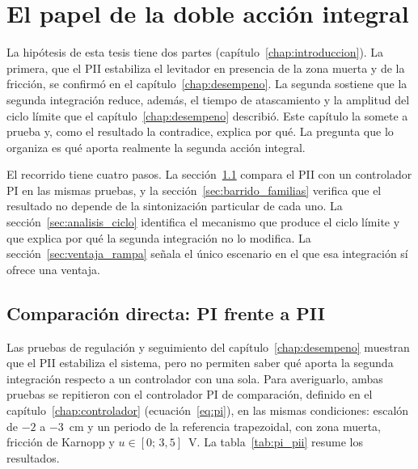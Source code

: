 \chapter{El papel de la doble acción integral}\label{chap:doble_integral}

La hipótesis de esta tesis tiene dos partes (capítulo~\ref{chap:introduccion}). La primera, que el PII estabiliza el levitador en presencia de la zona muerta y de la fricción, se confirmó en el capítulo~\ref{chap:desempeno}. La segunda sostiene que la segunda integración reduce, además, el tiempo de atascamiento y la amplitud del ciclo límite que el capítulo~\ref{chap:desempeno} describió. Este capítulo la somete a prueba y, como el resultado la contradice, explica por qué. La pregunta que lo organiza es qué aporta realmente la segunda acción integral.

El recorrido tiene cuatro pasos. La sección~\ref{sec:pi_pii} compara el PII con un controlador PI en las mismas pruebas, y la sección~\ref{sec:barrido_familias} verifica que el resultado no depende de la sintonización particular de cada uno. La sección~\ref{sec:analisis_ciclo} identifica el mecanismo que produce el ciclo límite y que explica por qué la segunda integración no lo modifica. La sección~\ref{sec:ventaja_rampa} señala el único escenario en el que esa integración sí ofrece una ventaja.

\section{Comparación directa: PI frente a PII}\label{sec:pi_pii}

Las pruebas de regulación y seguimiento del capítulo~\ref{chap:desempeno} muestran que el PII estabiliza el sistema, pero no permiten saber qué aporta la segunda integración respecto a un controlador con una sola. Para averiguarlo, ambas pruebas se repitieron con el controlador PI de comparación, definido en el capítulo~\ref{chap:controlador} (ecuación~\eqref{eq:pi}), en las mismas condiciones: escalón de $-2$ a $-3$~cm y un periodo de la referencia trapezoidal, con zona muerta, fricción de Karnopp y $u\in[0;\,3{,}5]$~V. La tabla~\ref{tab:pi_pii} resume los resultados.

